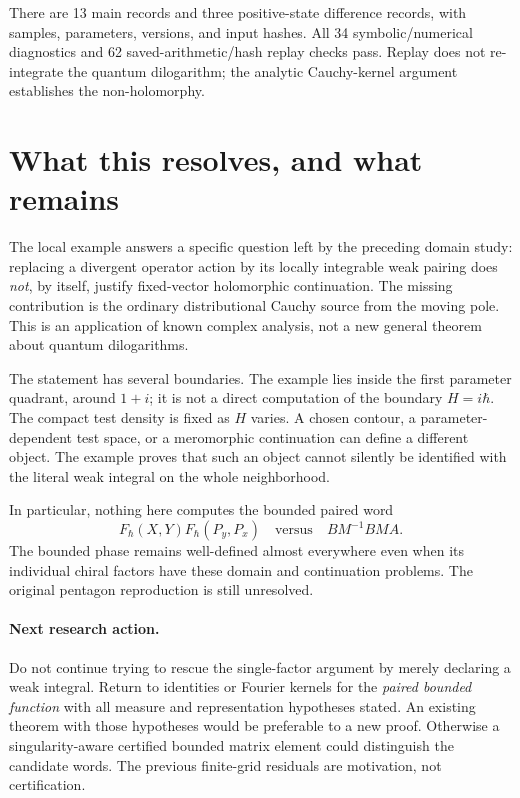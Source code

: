 \documentclass[11pt,a4paper]{article}
\begin{document}
There are 13 main records and three positive-state difference records,
with samples, parameters, versions, and input hashes.
All 34 symbolic/numerical diagnostics and 62 saved-arithmetic/hash
replay checks pass. Replay does not re-integrate the quantum dilogarithm;
the analytic Cauchy-kernel argument establishes the non-holomorphy.

\newpage
\section{What this resolves, and what remains}
The local example answers a specific question left by the preceding
domain study: replacing a divergent operator action by its
locally integrable weak pairing does \emph{not}, by itself, justify
fixed-vector holomorphic continuation. The missing contribution is
the ordinary distributional Cauchy source from the moving pole.
This is an application of known complex analysis, not a new general
theorem about quantum dilogarithms.

The statement has several boundaries.
The example lies inside the first parameter quadrant, around $1+i$;
it is not a direct computation of the boundary $H=i\hbar$.
The compact test density is fixed as $H$ varies.
A chosen contour, a parameter-dependent test space, or a
meromorphic continuation can define a different object.
The example proves that such an object cannot silently be identified
with the literal weak integral on the whole neighborhood.

In particular, nothing here computes the bounded paired word
\[
 F_\hbar(X,Y)F_\hbar(P_y,P_x)
 \quad\text{versus}\quad
 B M^{-1} B M A.
\]
The bounded phase remains well-defined almost everywhere even when its
individual chiral factors have these domain and continuation problems.
The original pentagon reproduction is still unresolved.

\paragraph{Next research action.}
Do not continue trying to rescue the single-factor argument by merely
declaring a weak integral. Return to identities or Fourier kernels
for the \emph{paired bounded function} with all measure and representation
hypotheses stated. An existing theorem with those hypotheses would be
preferable to a new proof. Otherwise a singularity-aware certified
bounded matrix element could distinguish the candidate words.
The previous finite-grid residuals are motivation, not certification.
\end{document}

